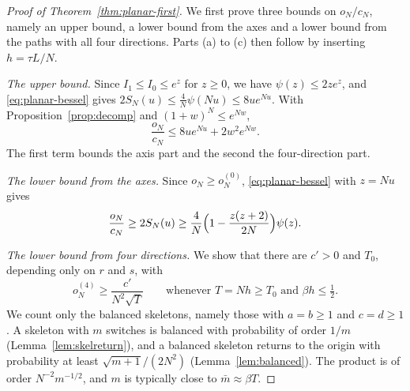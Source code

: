\begin{proof}[Proof of Theorem~\ref{thm:planar-first}]
We first prove three bounds on $o_N/c_N$, namely an upper bound, a lower bound from the axes and a
lower bound from the paths with all four directions. Parts (a) to (c) then follow by inserting
$h=\tau L/N$.

\emph{The upper bound.} Since $I_1\le I_0\le e^z$ for $z\ge0$, we have $\psi(z)\le2ze^z$, and
\eqref{eq:planar-bessel} gives $2S_N(u)\le\frac4N\psi(Nu)\le8ue^{Nu}$. With
Proposition~\ref{prop:decomp} and $(1+w)^N\le e^{Nw}$,
\begin{equation}\label{eq:app-planar-upper}
 \frac{o_N}{c_N}\le8ue^{Nu}+2w^2e^{Nw}.
\end{equation}
The first term bounds the axis part and the second the four-direction part.

\emph{The lower bound from the axes.} Since $o_N\ge o^{(0)}_N$, \eqref{eq:planar-bessel} with
$z=Nu$ gives
\begin{equation}\label{eq:app-planar-axes}
 \frac{o_N}{c_N}\ge2S_N(u)\ge\frac4N\Bigl(1-\frac{z(z+2)}{2N}\Bigr)\psi(z).
\end{equation}

\emph{The lower bound from four directions.} We show that there are $c'>0$ and $T_0$, depending
only on $r$ and $s$, with
\begin{equation}\label{eq:app-planar-four}
 o^{(4)}_N\ge\frac{c'}{N^2\sqrt T}\qquad\text{whenever }T=Nh\ge T_0\text{ and }\beta h\le\tfrac12 .
\end{equation}
We count only the balanced skeletons, namely those with $a=b\ge1$ and $c=d\ge1$. A skeleton with
$m$ switches is balanced with probability of order $1/m$ (Lemma~\ref{lem:skelreturn}), and a
balanced skeleton returns to the origin with probability at least $\sqrt{m+1}/(2N^2)$
(Lemma~\ref{lem:balanced}). The product is of order $N^{-2}m^{-1/2}$, and $m$ is typically close to
$\bar m\approx\beta T$.


\end{proof}
